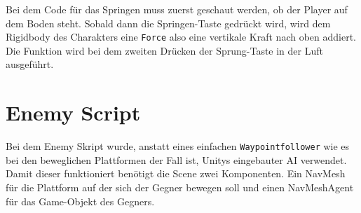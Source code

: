Bei dem Code für das Springen muss zuerst geschaut werden, ob der Player auf dem Boden steht. Sobald dann die Springen-Taste gedrückt wird, wird dem Rigidbody des Charakters eine \verb+Force+ also eine vertikale Kraft nach oben addiert. Die Funktion wird bei dem zweiten Drücken der Sprung-Taste in der Luft ausgeführt.

\pagebreak
\section{Enemy Script}

Bei dem Enemy Skript wurde, anstatt eines einfachen \verb+Waypointfollower+ wie es bei den beweglichen Plattformen der Fall ist, Unitys eingebauter AI verwendet. Damit dieser funktioniert benötigt die Scene zwei Komponenten. Ein NavMesh für die Plattform auf der sich der Gegner bewegen soll und einen NavMeshAgent für das Game-Objekt des Gegners.

